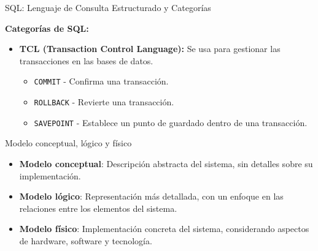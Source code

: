 \documentclass[spanish]{beamer}
\begin{document}
\begin{frame}{SQL: Lenguaje de Consulta Estructurado y Categorías}
    \begin{tcolorbox}[title=SQL,colback=orange!5!white,colframe=orange!75!black]
        \textbf{Categorías de SQL:}  
        \begin{itemize}


            \item \textbf{TCL (Transaction Control Language):}  
                Se usa para gestionar las transacciones en las bases de datos.  
              
                \begin{itemize}
                    \item \texttt{COMMIT} - Confirma una transacción.
                    \item \texttt{ROLLBACK} - Revierte una transacción.
                    \item \texttt{SAVEPOINT} - Establece un punto de guardado dentro de una transacción.
                \end{itemize}
        \end{itemize}
    \end{tcolorbox}
\end{frame}


\begin{frame}{Modelo conceptual, lógico y físico}
    \begin{itemize}
        \item \textbf{Modelo conceptual}: Descripción abstracta del sistema, sin detalles sobre su implementación.
        \item \textbf{Modelo lógico}: Representación más detallada, con un enfoque en las relaciones entre los elementos del sistema.
        \item \textbf{Modelo físico}: Implementación concreta del sistema, considerando aspectos de hardware, software y tecnología.
    \end{itemize}
\end{frame}



\end{document}
